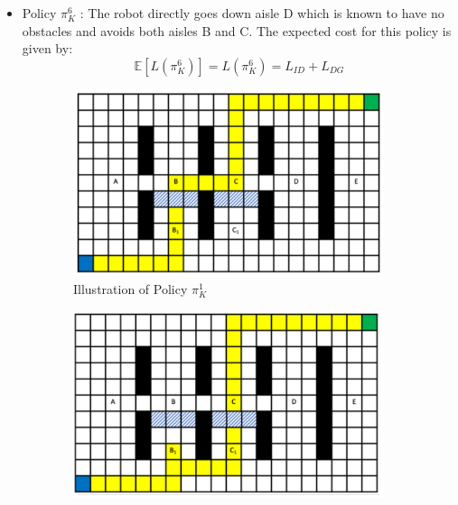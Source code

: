 \documentclass[a4paper,12pt]{article}
\begin{document}
\begin{itemize}
				\item Policy $\pi_{K}^{6}$ : The robot directly goes down aisle D which is known to have no obstacles and avoids both aisles B and C. The expected cost for this policy is given by:
				\begin{equation}
				\mathbb{E}\left[L\left(\pi_{K}^{6}\right)\right] = L\left(\pi_{K}^{6}\right) = L_{ID} + L_{DG}
				\label{eqn:policySixCost}
				\end{equation}
			\end{itemize}
			
			\begin{figure}[htp]
				\centering
				\begin{subfigure}{.45\textwidth}
					\centering
					\includegraphics[width=\textwidth]{blockedAisleB2}
					\caption{Illustration of Policy $\pi_{K}^{1}$}
					\label{fig:policy1Diagram}
				\end{subfigure}
				\begin{subfigure}{.45\textwidth}
					\centering
					\includegraphics[width=\textwidth]{blockedAisleC}

\end{subfigure}
\end{figure}
\end{document}
